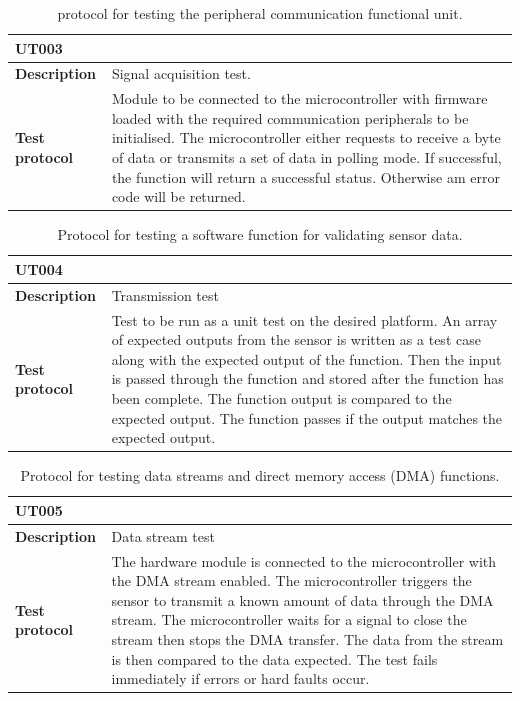 \begin{table}[H]
	\centering
	\caption{protocol for testing the peripheral communication functional unit. }
	\setlength{\extrarowheight}{5pt}
	\label{tab:UT003}
	\begin{tabular}{m{} m{}}
		\multicolumn{2}{l}{\textbf{UT003} }\\
		\hline
		\textbf{Description} & Signal acquisition test.\\
		\hline
		\hline
		\textbf{Test protocol} & Module to be connected to the microcontroller with firmware loaded with the required communication peripherals to be initialised. The microcontroller either requests to receive a byte of data or transmits a set of data in polling mode. If successful, the function will return a successful status. Otherwise am error code will be returned.\\
		\hline
		\hline
	\end{tabular}
\end{table}


\begin{table}[H]
	\centering
	\caption{Protocol for testing a software function for validating sensor data.}
	\label{tab:UT004}
		\setlength{\extrarowheight}{5pt}
	\begin{tabular}{m{} m{}}
		\multicolumn{2}{l}{\textbf{UT004} }\\
		\hline
		\textbf{Description} & Transmission test\\
		\hline
		\hline
		\textbf{Test protocol} & Test to be run as a unit test on the desired platform. An array of expected outputs from the sensor is written as a test case along with the expected output of the function. Then the input is passed through the function and stored after the function has been complete. The function output is compared to the expected output. The function passes if the output matches the expected output.    \\
		\hline
		\hline
	\end{tabular}
\end{table}

\begin{table}[H]
	\centering
	\caption{ Protocol for testing data streams and direct memory access (DMA) functions.}
	\label{tab:UT005}
	\setlength{\extrarowheight}{5pt}
	\begin{tabular}{m{} m{}}
		\multicolumn{2}{l}{\textbf{UT005} }\\
		\hline
		\textbf{Description} & Data stream test\\
		\hline
		\hline
		\textbf{Test protocol} & The hardware module is connected to the microcontroller with the DMA stream enabled. The microcontroller triggers the sensor to transmit a known amount of data through the DMA stream. The microcontroller waits for a signal to close the stream then stops the DMA transfer. The data from the stream is then compared to the data expected. The test fails immediately if errors or hard faults occur.\\
		\hline
		\hline
	\end{tabular}
\end{table}

